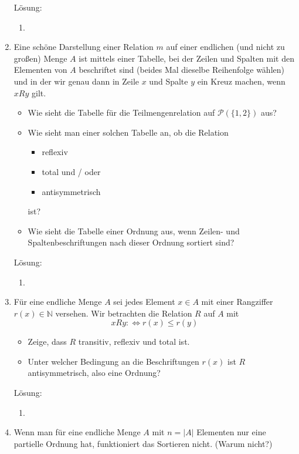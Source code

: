 \documentclass[main.tex]{subfiles}
\begin{document}
\begin{enumerate}
	      Lösung:
	      \begin{enumerate}
		      \item
	      \end{enumerate}
	\item Eine schöne Darstellung einer Relation \( m \) auf einer endlichen (und nicht zu
	      großen) Menge \( A \) ist mittels einer Tabelle, bei der Zeilen und Spalten mit den
	      Elementen von \( A \) beschriftet sind (beides Mal dieselbe Reihenfolge wählen)
	      und in der wir genau dann in Zeile \( x \) und Spalte \( y \) ein Kreuz machen, wenn
	      \( xRy \) gilt.
	      \begin{itemize}
		      \item  Wie sieht die Tabelle für die Teilmengenrelation auf \( \mathcal{P}(\{ 1, 2 \}) \) aus?
		      \item Wie sieht man einer solchen Tabelle an, ob die Relation
		            \begin{itemize}
			            \item reflexiv
			            \item total und / oder
			            \item antisymmetrisch
		            \end{itemize}
		            ist?
		      \item Wie sieht die Tabelle einer Ordnung aus, wenn Zeilen- und Spaltenbeschriftungen
		            nach dieser Ordnung sortiert sind?
	      \end{itemize}

	      Lösung:
	      \begin{enumerate}
		      \item
	      \end{enumerate}
	\item  Für eine endliche Menge \( A \) sei jedes Element \( x \in A \) mit einer Rangziffer
	      \( r(x) \in \mathbb{N} \) versehen. Wir betrachten die Relation \( R \) auf \( A \) mit
	      \[ xRy: \Leftrightarrow r(x) \leq r(y) \]
	      \begin{itemize}
		      \item Zeige, dass \( R \) transitiv, reflexiv und total ist.
		      \item Unter welcher Bedingung an die Beschriftungen \( r(x) \) ist \( R \) antisymmetrisch,
		            also eine Ordnung?
	      \end{itemize}

	      Lösung:
	      \begin{enumerate}
		      \item
	      \end{enumerate}
	\item Wenn man für eine endliche Menge \( A \) mit \( n = |A| \) Elementen nur eine
	      partielle Ordnung hat, funktioniert das Sortieren nicht. (Warum nicht?)


\end{enumerate}
\end{document}

